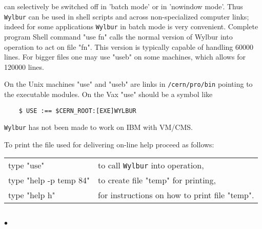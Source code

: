 can selectively be switched off in 'batch mode' or in
'nowindow mode'. Thus {\tt Wylbur} can be used in shell scripts
and across non-specialized computer links; indeed for some
applications {\tt Wylbur} in batch mode is very convenient.
\Structure
Complete program
\Usage
Shell command "use fn" calls the normal version of Wylbur into
operation to act on file "fn". This version is typically capable
of handling 60000 lines. For bigger files one may use "useb" on
some machines, which allows for 120000 lines.
\par
On the Unix machines "use" and "useb" are links in {\tt /cern/pro/bin}
pointing to the executable modules. On the Vax "use" should be
a symbol like
\begin{verbatim}
    $ USE :== $CERN_ROOT:[EXE]WYLBUR
\end{verbatim}
{\tt Wylbur} has not been made to work on IBM with VM/CMS.
\par
To print the file used for delivering on-line help proceed as
follows: \\
\begin{tabular}[t]{ll}
type "use"             & to call {\tt Wylbur} into operation, \\
type "help -p temp 84" & to create file "temp" for printing, \\
type "help h"          & for instructions on how to print file "temp".\\
\end{tabular} \\[2mm]
$\bullet$
